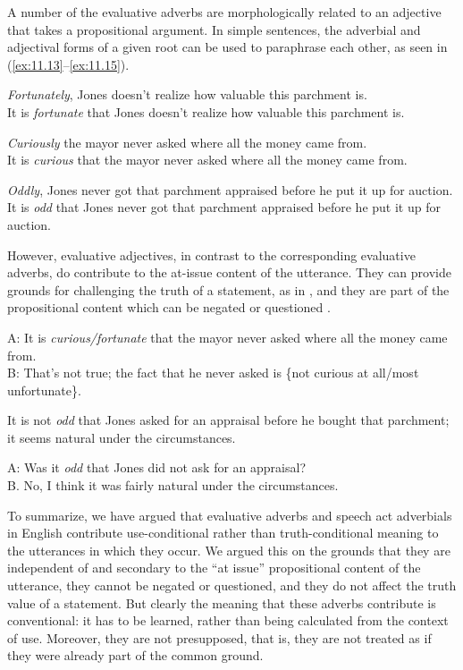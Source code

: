 A number of the evaluative adverbs are morphologically related to an adjective that takes a propositional argument. In simple sentences, the adverbial and adjectival forms of a given root can be used to paraphrase each other, as seen in (\ref{ex:11.13}--\ref{ex:11.15}).


\ea \label{ex:11.13}
\ea \textit{Fortunately}, Jones doesn’t realize how valuable this parchment is.\\
\ex It is \textit{fortunate} that Jones doesn’t realize how valuable this parchment is.
                       \z
\z

\ea \label{ex:11.14}
\ea \textit{Curiously} the mayor never asked where all the money came from.\\
\ex It is \textit{curious} that the mayor never asked where all the money came from.
\z \z

\ea \label{ex:11.15}
\ea \textit{Oddly}, Jones never got that parchment appraised before he put it up for auction.\\
\ex It is \textit{odd} that Jones never got that parchment appraised before he put it up for auction.
                       \z
\z


However, evaluative adjectives, in contrast to the corresponding evaluative adverbs, do contribute to the at-issue content of the utterance. They can provide grounds for challenging the truth of a statement, as in , and they are part of the propositional content which can be negated  or questioned .


\ea \label{ex:11.16}
A: It is \textit{curious/fortunate} that the mayor never asked where all the money came from.\\
B: That’s not true; the fact that he never asked is \{not curious at all/most unfortunate\}.
\z

\ea \label{ex:11.17}
It is not \textit{odd} that Jones asked for an appraisal before he bought that parchment; it seems natural under the circumstances.
\z

\ea \label{ex:11.18}
A: Was it \textit{odd} that Jones did not ask for an appraisal?\\
B. No, I think it was fairly natural under the circumstances.
\z


To summarize, we have argued that evaluative adverbs and speech act adverbials in English contribute use-conditional rather than truth-conditional meaning to the utterances in which they occur. We argued this on the grounds that they are independent of and secondary to the “at issue” propositional content of the utterance, they cannot be negated or questioned, and they do not affect the truth value of a statement. But clearly the meaning that these adverbs contribute is conventional: it has to be learned, rather than being calculated from the context of use. Moreover, they are not presupposed, that is, they are not treated as if they were already part of the common ground.


